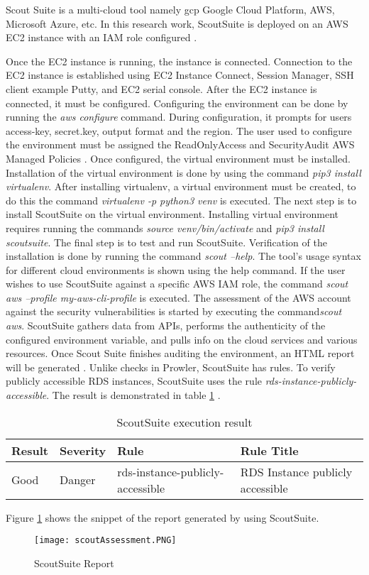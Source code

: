 \par Scout Suite is a multi-cloud tool namely \gls{gcp}
Google Cloud Platform, AWS, Microsoft Azure, etc.
In this research work, ScoutSuite is deployed on an AWS EC2 instance with an
IAM role configured \cite{87}.

\par Once the EC2 instance is running, the instance is connected.
Connection to the EC2 instance is established using EC2 Instance Connect, Session Manager, SSH client example Putty, and EC2 serial console.
After the EC2 instance is connected, it must be configured.
Configuring the environment can be done by running the
\textit{aws configure} command.
During configuration, it prompts for users access-key,
secret.key, output format and the region.
The user used to configure the environment must
be assigned the
ReadOnlyAccess and SecurityAudit AWS Managed Policies
\cite{87}.
Once configured, the virtual environment must be installed.
Installation of the virtual environment is done by using the command \textit{pip3 install virtualenv}.
After installing virtualenv, a virtual environment must be created, to do this the command \textit{virtualenv -p python3 venv} is executed.
The next step is to install ScoutSuite on the virtual environment.
Installing virtual environment requires running the commands \textit{source venv/bin/activate} and \textit{pip3 install scoutsuite}.
The final step is to test and run ScoutSuite.
Verification of the installation is done by running the command \textit{scout --help}.
The tool's usage syntax for different cloud environments is shown using the help command.
If the user wishes to use ScoutSuite against a specific
AWS IAM role, the command \textit{scout aws --profile my-aws-cli-profile} is executed.
The assessment of the AWS account against the security
vulnerabilities is started by executing the command\textit{scout aws}.
ScoutSuite gathers data from APIs, performs the authenticity of the configured environment variable, and pulls info on the cloud services and various resources.
Once Scout Suite finishes auditing the environment, an
HTML report will be generated \cite{87}.
Unlike checks in Prowler, ScoutSuite has rules.
To verify publicly accessible RDS instances, ScoutSuite uses the rule \textit{rds-instance-publicly-accessible}.
The result is demonstrated in table
\ref{tab:scoutsuiterule} \cite{88}.

\begin{table}[h!]
    \begin{center}
        \caption{ScoutSuite execution result}
        \label{tab:scoutsuiterule}
        \begin{tabular}{|p{1.4cm}|p{1.7cm}|p{5.0cm}|p{6.0cm}|}
            \hline
            \textbf{Result} & \textbf{Severity} & \textbf{Rule} & \textbf{Rule Title}\\
            \hline
            Good & Danger & rds-instance-publicly-accessible & RDS Instance publicly accessible \\
            \hline
        \end{tabular}
    \end{center}
\end{table}


Figure \ref{fig:deployscoutsuite} shows the snippet of
the report generated by using ScoutSuite.

\begin{figure}
    \centering
    \texttt{[image: scoutAssessment.PNG]}
    \caption{ScoutSuite Report}
    \label{fig:deployscoutsuite}
\end{figure}